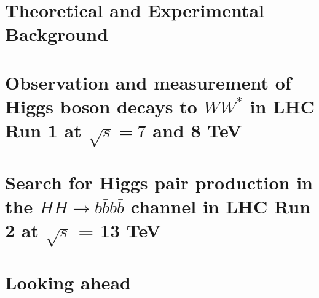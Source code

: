 \documentclass{Dissertate}
\begin{document}


\maketitle
\copyrightpage

\abstractpage
\tableofcontents
\listoffigures
\listoftables
\dedicationpage
\acknowledgments

\doublespacing

\setcounter{chapter}{-1}  %

\part{Theoretical and Experimental Background}



\part{Observation and measurement of Higgs boson decays to $WW^*$ in LHC Run 1 at $\sqrt{s} = 7$ and 8 TeV}









\part{Search for Higgs pair production in the $HH\rightarrow
  b\bar{b}b\bar{b}$ channel in LHC Run 2 at $\sqrt{s}$ = 13 TeV}






\part{Looking ahead}

\begin{appendices}
   
   
\end{appendices}


\clearpage
{}




\end{document}
